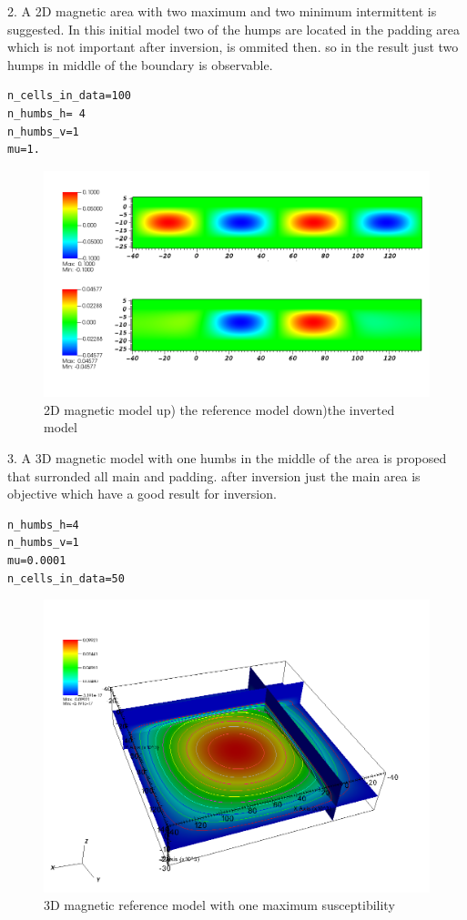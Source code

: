 2. A 2D magnetic area with two maximum and two minimum intermittent is suggested. In this initial model two of the humps are located in the padding area which is not important after inversion, is ommited then. so in the result just two humps in middle of the boundary is observable.\\
\begin{verbatim}
n_cells_in_data=100
n_humbs_h= 4
n_humbs_v=1
mu=1.
\end{verbatim}

\begin{figure}
\centering
\includegraphics[width=\textwidth]{mag2D4.png}
\caption{2D magnetic model up) the reference model  down)the inverted model}

\end{figure}

3. A 3D magnetic model with one humbs in the middle of the area is proposed that surronded all main and padding. after inversion just the main area is objective which have a good result for inversion.\\
\begin{verbatim}
n_humbs_h=4
n_humbs_v=1
mu=0.0001
n_cells_in_data=50
\end{verbatim}

\begin{figure}
\centering
\includegraphics[width=\textwidth]{mag3D1-ref.png}
\caption{3D magnetic reference model with one maximum susceptibility}

\end{figure}


